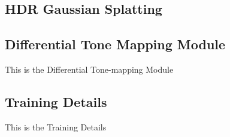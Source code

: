\subsection{HDR Gaussian Splatting}

\subsection{Differential Tone Mapping Module}

This is the Differential Tone-mapping Module

\subsection{Training Details}

This is the Training Details